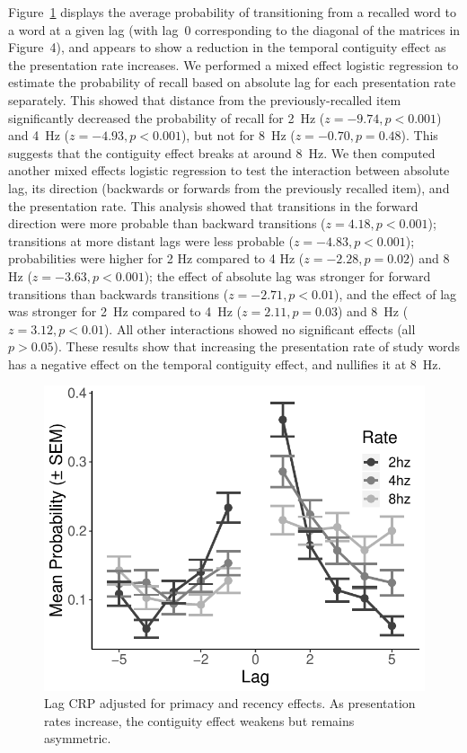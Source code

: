 \documentclass[10pt,letterpaper]{article}
\begin{document}
Figure~\ref{CRP} displays the average probability of transitioning from a
recalled word to a word at a given lag (with lag~0 corresponding to
the diagonal of the matrices in Figure~4), and appears to show a reduction in
the temporal contiguity effect as the presentation rate increases. We
performed a mixed effect logistic regression to estimate the probability of
recall based on absolute lag for each presentation rate separately. This showed 
that distance from the previously-recalled item significantly decreased the probability
of recall for 2~Hz ($z=-9.74, p<0.001$) and 4~Hz ($z=-4.93, p<0.001$), but not for 8~Hz ($z=-0.70, p=0.48$).
This suggests that the contiguity effect breaks at around 8~Hz.
We then computed another mixed effects logistic regression to test 
the interaction between absolute lag, its direction (backwards
or forwards from the previously recalled item), and the presentation rate.
This analysis showed that transitions in the forward direction were more
probable than backward transitions ($z = 4.18, p<0.001$); transitions at more
distant lags were less probable ($z=-4.83, p<0.001$); probabilities were
higher for 2 Hz compared to 4 Hz ($z=-2.28, p=0.02$) and 8 Hz ($z=-3.63, p<0.001$); 
the effect of absolute lag was stronger for forward transitions than backwards transitions ($z=-2.71,
p<0.01$), and the effect of lag was stronger for 2~Hz compared to 4~Hz
($z=2.11, p=0.03$) and 8~Hz ($z=3.12, p<0.01$). All other interactions showed
no significant effects (all $p>0.05$). These results show that increasing the
presentation rate of study words has a negative effect on the temporal
contiguity effect, and nullifies it at 8~Hz.

\begin{figure}
\begin{center}
\includegraphics[width = .4\textwidth]{CRP_adjusted.pdf}
\end{center}
\caption{Lag CRP adjusted for primacy and recency effects. As presentation rates increase, the contiguity effect weakens but remains asymmetric.} 
\label{CRP}
\end{figure}
\end{document}

